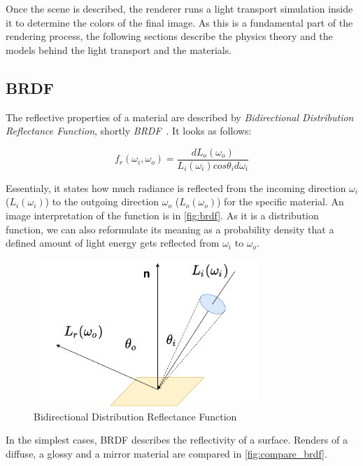 Once the scene is described, the renderer runs a light transport simulation inside it to determine the colors of the final image. As this is a fundamental part of the rendering process, the following sections describe the physics theory and the models behind the light transport and the materials.

\subsection{BRDF}
\label{sec:BRDF}

The reflective properties of a material are described by \emph{Bidirectional Distribution Reflectance Function}, shortly \emph{BRDF}~\cite{nicodemus1965directional}. It looks as follows:

\begin{equation} \label{eq:brdf}
f_r(\omega_i,\omega_o)=\frac{dL_o(\omega_o)}{L_i(\omega_i)cos\theta_i d\omega_i}
\end{equation}

Essentialy, it states how much radiance is reflected from the incoming direction $\omega_i$ ($L_i(\omega_i)$) to the outgoing direction $\omega_o$ ($L_o(\omega_o)$) for the specific material.
An image interpretation of the function is in \autoref{fig:brdf}. As it is a distribution function, we can also reformulate its meaning as a probability density that a defined amount of light energy gets reflected from $\omega_i$ to $\omega_o$.

\begin{figure}[h]
	\centering
	\includegraphics[width=85mm]{img/brdf.pdf}
	\caption{Bidirectional Distribution Reflectance Function}
	\label{fig:brdf}
\end{figure}

In the simplest cases, BRDF describes the reflectivity of a surface. Renders of a diffuse, a glossy and a mirror material are compared in \autoref{fig:compare_brdf}.

